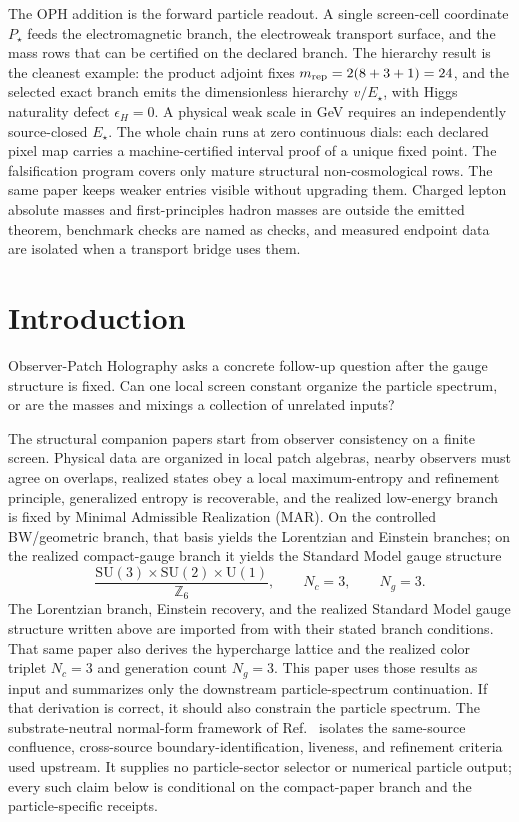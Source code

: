 \documentclass[11pt]{article}
\newcommand{\SU}{\mathrm{SU}}
\newcommand{\U}{\mathrm{U}}
\begin{document}
The OPH addition is the forward particle readout. A single screen-cell coordinate \(P_\star\)
feeds the electromagnetic branch, the electroweak transport surface, and the mass rows that can be
certified on the declared branch. The hierarchy result is the cleanest example: the product
adjoint fixes \(m_{\rm rep}=2(8+3+1)=24\), and the selected exact branch emits the dimensionless hierarchy
\(v/E_\star\), with Higgs naturality defect \(\epsilon_H=0\).  A physical weak
scale in GeV requires an independently source-closed \(E_\star\). The whole chain runs at zero
continuous dials: each declared pixel map carries a machine-certified interval proof of a unique
fixed point. The falsification program covers only mature structural
non-cosmological rows. The same
paper keeps weaker entries visible without upgrading them. Charged
lepton absolute masses and first-principles hadron masses are outside the emitted theorem,
benchmark checks are named as checks, and measured endpoint data are isolated when a transport
bridge uses them.

\section{Introduction}

Observer-Patch Holography asks a concrete follow-up question after the gauge structure is fixed.
Can one local screen constant organize the particle spectrum, or are the masses and mixings a
collection of unrelated inputs?

The structural companion papers start from observer consistency on a finite screen. Physical data are organized in local patch algebras, nearby observers must agree on overlaps, realized states obey a local maximum-entropy and refinement principle, generalized entropy is recoverable, and the realized low-energy branch is fixed by Minimal Admissible Realization (MAR). On the controlled BW/geometric branch, that basis yields the Lorentzian and Einstein branches; on the realized compact-gauge branch it yields the Standard Model gauge structure
\[
\frac{\SU(3)\times\SU(2)\times\U(1)}{\mathbb Z_6},
\qquad
N_c=3,
\qquad
N_g=3.
\]
The Lorentzian branch, Einstein recovery, and the realized Standard Model gauge structure written
above are imported from \cite{ophcompact} with their stated branch conditions. That same paper also derives the hypercharge lattice and
the realized color triplet \(N_c=3\) and generation count \(N_g=3\). This paper uses those results as input and summarizes only the
downstream particle-spectrum continuation. If that derivation is correct, it should also constrain the particle spectrum.
The substrate-neutral normal-form framework of Ref.~\cite{observableNormalForms} isolates the
same-source confluence, cross-source boundary-identification, liveness, and refinement criteria
used upstream.  It supplies no particle-sector selector or numerical particle output; every such
claim below is conditional on the compact-paper branch and the particle-specific receipts.
\end{document}
